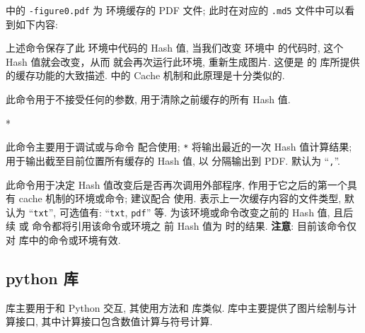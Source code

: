 \documentclass[
  hyper, lang=cn, 
  class=l3dox, 
]{../../zlatex/code/ztex}
\begin{document}
 中的 \texttt{-figure0.pdf} 为  环境缓存的 PDF 文件; 
此时在对应的 \texttt{.md5} 文件中可以看到如下内容:


\begin{DocExample}
\def \tikzexternallastkey {AE7F2539E81C96848ADCCEE3994993D1}%
\end{DocExample}
\resetExampleUR


上述命令保存了此  环境中代码的 Hash 值, 当我们改变  环境中
的代码时, 这个 Hash 值就会改变，从而 \TikZ{} 就会再次运行此环境, 重新生成图片. 这便是 \TikZ{} 的
 库所提供的缓存功能的大致描述. \zTikZ{} 中的 Cache 机制和此原理是十分类似的.


\begin{function}[added=2025-05-15]{\ztikzHashClean}
  此命令用于不接受任何的参数, 用于清除之前缓存的所有 Hash 值.
\end{function}


\begin{function}[added=2025-05-15]{\ztikzHashCurrent}
  \begin{syntax}
    *
  \end{syntax}
  此命令主要用于调试或与命令  配合使用; \texttt{*} 将输出最近的一次 Hash 值计算结果;
   用于输出截至目前位置所有缓存的 Hash 值, 以  分隔输出到 PDF.
   默认为 ``\texttt{,}''.
\end{function}


\begin{function}[added=2025-05-15]{\ztikzHashchgNorun}
  \begin{syntax}
  \end{syntax}
  此命令用于决定 Hash 值改变后是否再次调用外部程序, 作用于它之后的第一个具有 cache 机制的环境或命令; 建议配合 
  使用.  表示上一次缓存内容的文件类型, 默认为 ``\texttt{txt}'', 可选值有: ``\texttt{txt}, \texttt{pdf}'' 等. 
   为该环境或命令改变之前的 Hash 值, 且后续  或  命令都将引用该命令或环境之
  前 Hash 值为  时的结果. \textbf{注意}: 目前该命令仅对  库中的命令或环境有效.
\end{function}


\clearpage
\subsection{python 库}
 库主要用于和 Python 交互, 其使用方法和  库类似.  
库中主要提供了图片绘制与计算接口, 其中计算接口包含数值计算与符号计算.
\end{document}
